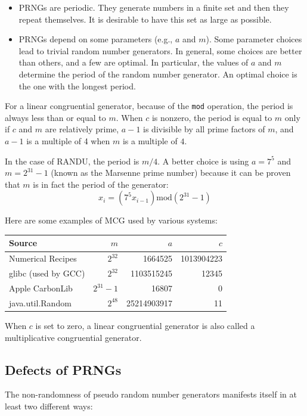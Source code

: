\documentclass[justified, sixbynine]{tufte-book}
\def\ft{\small\tt}
\theoremstyle{plain}%
\newtheorem * {corollary}{Corollary}
\theoremstyle{definition}
\theoremstyle{remark}
\newtheorem * {remark}{Remark}
\newtheorem * {note}{Note}
\begin{document}
\begin{fullwidth}
\begin{itemize}
\item PRNGs are periodic. They generate numbers in a finite set and then they repeat themselves. It is desirable to have this set as large as possible.

\item  PRNGs depend on some parameters (e.g., $a$ and $m$). Some
parameter choices lead to trivial random number generators. In
general, some choices are better than others, and a few are optimal. In
particular, the values of $a$ and $m$ determine the period of the random
number generator. An optimal choice is the one with the longest period.
\end{itemize}

For a linear congruential generator, because of the {\ft mod} operation, the period is always less than or equal to $m$. When $c$ is nonzero, the period is equal to $m$ only if $c$ and $m$ are relatively prime, $a-1$ is divisible by all prime factors of $m$, and $a-1$ is a multiple of 4 when $m$ is a multiple of $4$.

In the case of RANDU, the period is $m/4$. A better choice is using $a=7^5$ and $m=2^{31}-1$ (known as the Marsenne prime number) because it can be proven that $m$ is in fact the period of the generator:
\begin{equation}
x_i=(7^5x_{i-1})\textrm{mod}(2^{31}-1)  \label{Marsenne}
\end{equation}

Here are some examples of MCG used by various systems:

\begin{tabular}{|lrrr|} \hline
Source & $m$ & $a$ & $c$ \\ \hline
Numerical Recipes & $2^{32}$ & 1664525 & 1013904223 \\
glibc (used by GCC) & $2^{32}$ & 1103515245 & 12345 \\
Apple CarbonLib & $2^{31} - 1$ & 16807 & 0 \\
java.util.Random & $2^{48}$ & 25214903917 & 11 \\ \hline
\end{tabular}

When $c$ is set to zero, a linear congruential generator is also called a multiplicative congruential generator.

\goodbreak\subsection{Defects of PRNGs}

The non-randomness of pseudo random number generators manifests itself in at
least two different ways:


\end{fullwidth}
\end{document}
